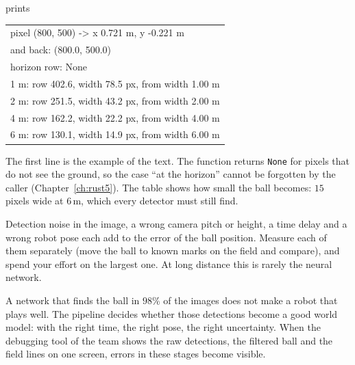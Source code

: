 prints
\begin{center}\small\ttfamily
\begin{tabular}{@{}l@{}}
pixel (800, 500) -> x 0.721 m, y -0.221 m\\
and back: (800.0, 500.0)\\
horizon row: None\\
1 m: row 402.6, width 78.5 px, from width 1.00 m\\
2 m: row 251.5, width 43.2 px, from width 2.00 m\\
4 m: row 162.2, width 22.2 px, from width 4.00 m\\
6 m: row 130.1, width 14.9 px, from width 6.00 m
\end{tabular}
\end{center}
The first line is the example of the text. The function returns \verb!None! for pixels that do not see the ground, so the case ``at the horizon'' cannot be forgotten by the caller (Chapter~\ref{ch:rust5}). The table shows how small the ball becomes: $15$ pixels wide at $6$\,m, which every detector must still find.

\begin{keyidea}
Detection noise in the image, a wrong camera pitch or height, a time delay and a wrong robot pose each add to the error of the ball position. Measure each of them separately (move the ball to known marks on the field and compare), and spend your effort on the largest one. At long distance this is rarely the neural network.
\end{keyidea}

\begin{aibox}
A network that finds the ball in $98\%$ of the images does not make a robot that plays well. The pipeline decides whether those detections become a good world model: with the right time, the right pose, the right uncertainty. When the debugging tool of the team shows the raw detections, the filtered ball and the field lines on one screen, errors in these stages become visible.
\end{aibox}

